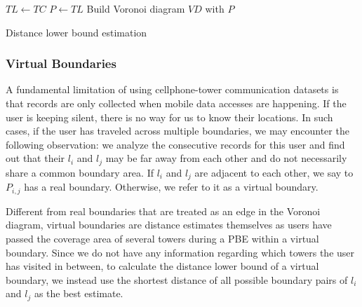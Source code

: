 \begin{algorithm}
 $TL \leftarrow TC$ \; 
 $P \leftarrow TL$ \;
 Build Voronoi diagram $VD$ with $P$ \;
 \caption{Distance lower bound estimation}\label{alg:DLB_estimation}
\end{algorithm}


\subsubsection{Virtual Boundaries}

A fundamental limitation of using cellphone-tower communication datasets is that records are only collected when mobile data accesses are happening. If the user is keeping silent, there is no way for us to know their locations. In such cases, if the user has traveled across multiple boundaries, we may encounter the following observation: we analyze the consecutive records for this user and find out that their $l_i$ and $l_j$  may be far away from each other and do not necessarily share a common boundary area. If $l_i$ and $l_j$ are adjacent to each other, we say to $P_{i,j}$ has a real boundary. Otherwise, we refer to it as a virtual boundary.

Different from real boundaries that are treated as an edge in the Voronoi diagram, virtual boundaries are distance estimates themselves as users have passed the coverage area of several towers during a PBE within a virtual boundary. Since we do not have any information regarding which towers the user has visited in between, to calculate the distance lower bound of a virtual boundary, we instead use the shortest distance of all possible boundary pairs of $l_i$ and $l_j$ as the best estimate.

